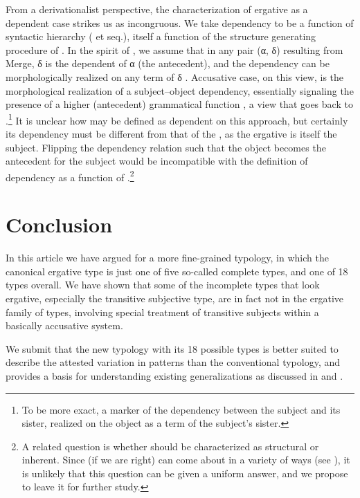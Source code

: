 \documentclass[output=paper]{langsci/langscibook}
\begin{document}
From a derivationalist perspective, the characterization of ergative as a
dependent case strikes us as incongruous. We take dependency to be a function
of syntactic hierarchy (\citealt{Zwart2004} et seq.), itself a function of the
structure generating procedure  of \citet{Chomsky1993}. In the spirit of
\citet{Epstein1999}, we assume that in any pair (α, δ) resulting from Merge, δ
is the dependent of α (the antecedent), and the dependency can be
morphologically realized on any term of δ \citep{Zwart2006b}. Accusative case,
on this view, is the morphological realization of a subject--object dependency,
essentially signaling the presence of a higher (antecedent) grammatical
function \citep{Zwart2006a}, a view that goes back to
\citet{Jakobson1936}.\footnote{To be more exact, a marker of the dependency
between the subject and its sister, realized on the object as a term of the
subject’s sister.\label{fn:29}} It is unclear how  may be defined
as dependent on this approach, but certainly its dependency must be different
from that of the , as the ergative is itself the subject.
Flipping the dependency relation such that the object becomes the antecedent
for the subject would be incompatible with the definition of dependency as a
function of .\footnote{A related question is whether  should
    be characterized as structural or inherent. Since (if we are right)
     can come about in a variety of ways (see
    ), it is unlikely that this question can be given a
uniform answer, and we propose to leave it for further study.\label{fn:30}}

\section{Conclusion}\label{sec:11.7}

In this article we have argued for a more fine-grained  typology, in
which  the canonical ergative  type is just one of five so-called
complete types, and one of 18 types overall. We have shown that some of the
incomplete types that look ergative, especially the transitive subjective type,
are in fact not in the ergative family of types, involving special treatment of
transitive subjects within a basically accusative  system.

We submit that the new  typology with its 18 possible types is better
suited to describe the attested variation in  patterns than the
conventional  typology, and provides a basis for understanding
existing  generalizations as discussed in \citet{Sheehan2014} and
\citet{Deal2015}.\largerpage
\end{document}
